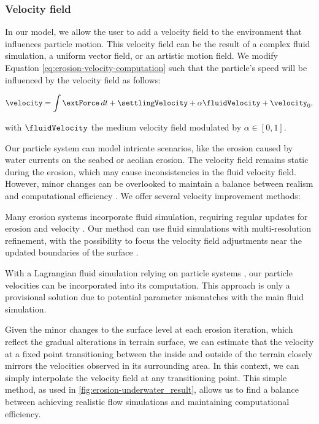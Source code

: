 \subsubsection{Velocity field}
\label{sec:erosion-velocity_field_refinement}

In our model, we allow the user to add a velocity field to the environment that influences particle motion. This velocity field can be the result of a complex fluid simulation, a uniform vector field, or an artistic motion field.
We modify Equation \eqref{eq:erosion-velocity-computation} such that the particle's speed will be influenced by the velocity field as follows:

\begin{align}
    \label{eq:erosion-velocity-computation-final}
    \velocity = \int{ \extForce \, dt} + \settlingVelocity + \alpha \fluidVelocity + \velocity_0,
\end{align}

with $\fluidVelocity$ the medium velocity field modulated by $\alpha \in [0,1]$. 

Our particle system can model intricate scenarios, like the erosion caused by water currents on the seabed or aeolian erosion. The velocity field remains static during the erosion, which may cause inconsistencies in the fluid velocity field. However, minor changes can be overlooked to maintain a balance between realism and computational efficiency \cite{Tychonievich2010}. We offer several velocity improvement methods: 
\begin{Itemize}
     Many erosion systems incorporate fluid simulation, requiring regular updates for erosion and velocity \cite{Kristof2009, Wojtan2007}. Our method can use fluid simulations with multi-resolution refinement, with the possibility to focus the velocity field adjustments near the updated boundaries of the surface \cite{Roose2011}. 
    
     With a Lagrangian fluid simulation relying on particle systems \cite{Koschier2022}, our particle velocities can be incorporated into its computation. This approach is only a provisional solution due to potential parameter mismatches with the main fluid simulation. 

     Given the minor changes to the surface level at each erosion iteration, which reflect the gradual alterations in terrain surface, we can estimate that the velocity at a fixed point transitioning between the inside and outside of the terrain closely mirrors the velocities observed in its surrounding area. In this context, we can simply interpolate the velocity field at any transitioning point. This simple method, as used in \cref{fig:erosion-underwater_result}, allows us to find a balance between achieving realistic flow simulations and maintaining computational efficiency.
\end{Itemize}

